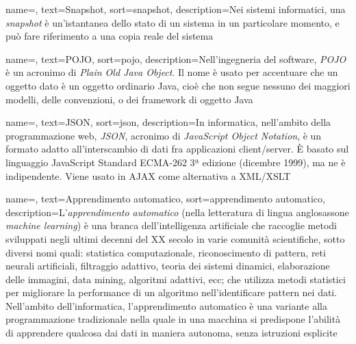 {
    name=,
    text=Snapshot,
    sort=snapshot,
    description={Nei sistemi informatici, una \textit{snapshot} è un'istantanea dello stato di un sistema in un particolare momento, e può fare riferimento a una copia reale del sistema}
}

{
    name=,
    text=POJO,
    sort=pojo,
    description={Nell'ingegneria del software, \textit{POJO} è un acronimo di \textit{Plain Old Java Object}. Il nome è usato per accentuare che un oggetto dato è un oggetto ordinario Java, cioè che non segue nessuno dei maggiori modelli, delle convenzioni, o dei \gls{framework} di oggetto Java}
}

{
    name=,
    text=JSON,
    sort=json,
    description={In informatica, nell'ambito della programmazione web, \textit{JSON}, acronimo di \textit{JavaScript Object Notation}, è un formato adatto all'interscambio di dati fra applicazioni client/server.
È basato sul linguaggio JavaScript Standard ECMA-262 3ª edizione (dicembre 1999), ma ne è indipendente. Viene usato in AJAX come alternativa a XML/XSLT
}
}

{
    name=,
    text=Apprendimento automatico,
    sort=apprendimento automatico,
    description={L'\textit{apprendimento automatico} (nella letteratura di lingua anglosassone \textit{machine learning}) è una branca dell'intelligenza artificiale che raccoglie metodi sviluppati negli ultimi decenni del XX secolo in varie comunità scientifiche, sotto diversi nomi quali: statistica computazionale, riconoscimento di pattern, reti neurali artificiali, filtraggio adattivo, teoria dei sistemi dinamici, elaborazione delle immagini, data mining, algoritmi adattivi, ecc; che utilizza metodi statistici per migliorare la performance di un algoritmo nell'identificare pattern nei dati. Nell'ambito dell'informatica, l'apprendimento automatico è una variante alla programmazione tradizionale nella quale in una macchina si predispone l'abilità di apprendere qualcosa dai dati in maniera autonoma, senza istruzioni esplicite}
}

